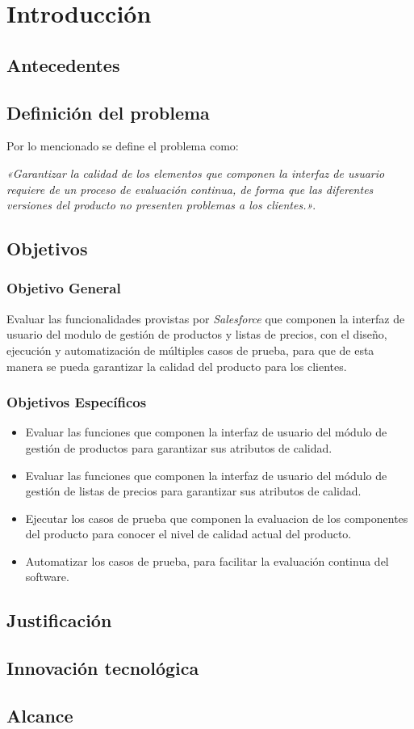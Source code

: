 \chapter{Introducción}

\section{Antecedentes}

\section{Definición del problema}
Por lo mencionado se define el problema como:

\emph{«Garantizar la calidad de los elementos que componen la interfaz de
usuario requiere de un proceso de evaluación continua, de forma que las
diferentes versiones del producto no presenten problemas a los clientes.»}.

\section{Objetivos}

\subsection{Objetivo General}
Evaluar las funcionalidades provistas por \emph{Salesforce} que componen la
interfaz de usuario del modulo de gestión de productos y listas de precios, con
el diseño, ejecución y automatización de múltiples casos de prueba, para que de
esta manera se pueda garantizar la calidad del producto para los clientes.

\subsection{Objetivos Específicos}
\begin{itemize}
\item Evaluar las funciones que componen la interfaz de usuario del módulo de
    gestión de productos para garantizar sus atributos de calidad.
\item Evaluar las funciones que componen la interfaz de usuario del módulo de
    gestión de listas de precios para garantizar sus atributos de calidad.
\item Ejecutar los casos de prueba que componen la evaluacion de los
    componentes del producto para conocer el nivel de calidad actual del
    producto.
\item Automatizar los casos de prueba, para facilitar la evaluación continua del
    software.
\end{itemize}

\section{Justificación}

\section{Innovación tecnológica}

\section{Alcance}

